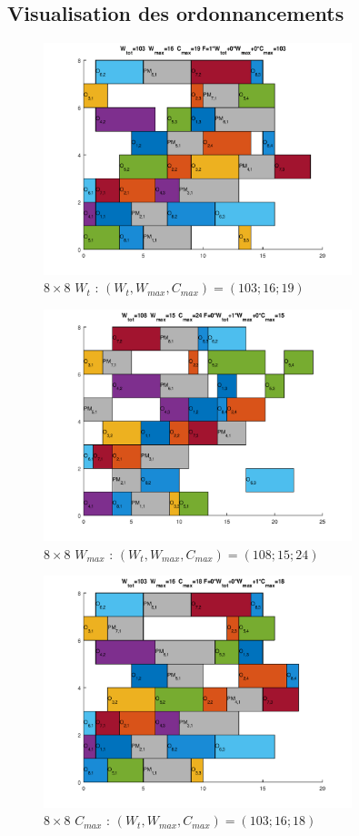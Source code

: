 \documentclass[10pt,a4paper]{scrartcl}
\begin{document}
\subsection{Visualisation des ordonnancements}
\label{annexe:visual_ordo}
\begin{figure}
  \centering
  \includegraphics[width=0.8\textwidth]{img/results8x8_Wtot.png}
  \caption{$8 \times 8$ $W_{t}$ : $(W_t, W_{max}, C_{max}) = (103; 16; 19)$}
\end{figure}
\begin{figure}
  \centering
  \includegraphics[width=0.8\textwidth]{img/results8x8_Wmax.png}
  \caption{$8 \times 8$ $W_{max}$ : $(W_t, W_{max}, C_{max}) = (108; 15; 24)$}
\end{figure}
\begin{figure}
  \centering
  \includegraphics[width=0.8\textwidth]{img/results8x8_Cmax.png}
  \caption{$8 \times 8$ $C_{max}$ : $(W_t, W_{max}, C_{max}) = (103; 16; 18)$}
\end{figure}
\end{document}
